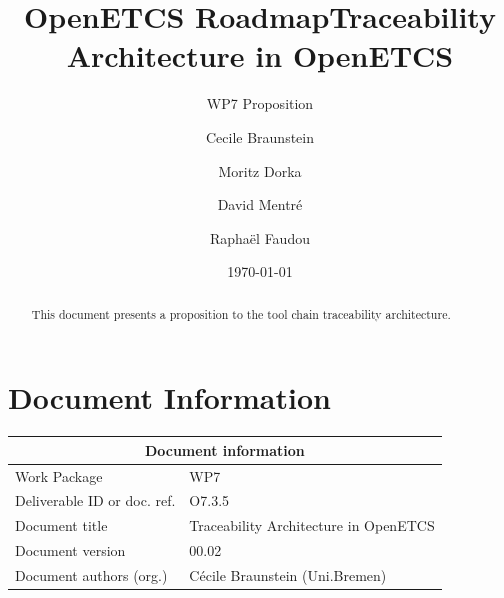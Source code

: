 \documentclass[11pt]{template/openetcs_report}
\begin{document}
\frontmatter
{}




\title{OpenETCS Roadmap}




\date{\today}
\title{Traceability Architecture in OpenETCS}
\subtitle{WP7 Proposition}

\techassessorname{}
\techassessoraffil{}

\qualityassessorname{}
\qualityassessoraffil{}

\approvalname{}
\approvalaffil{}
\author{Cecile Braunstein}

\author{Moritz Dorka}

\author{David Mentré}

\author{Raphaël Faudou}





\begin{abstract}
This document presents a proposition to the tool chain traceability
architecture.
\end{abstract}


\maketitle
\tableofcontents

\newpage

\chapter{Document Information}

\begin{tabular}{|p{4.4cm}|p{8.7cm}|}

\hline
\multicolumn{2}{|c|}{Document information} \\
\hline
Work Package &  WP7  \\
Deliverable ID or doc. ref. & O7.3.5\\
\hline
Document title &Traceability Architecture in OpenETCS \\
Document version & 00.02 \\
Document authors (org.)  & Cécile Braunstein (Uni.Bremen) \\
\hline
\end{tabular}
\end{document}
